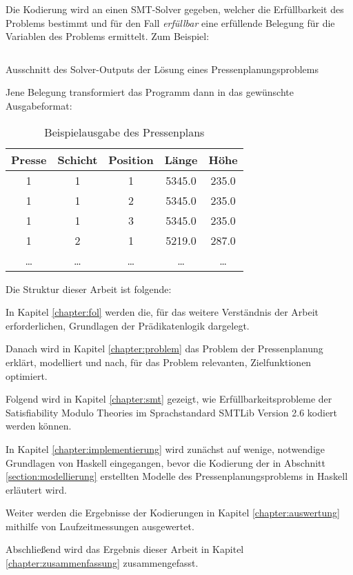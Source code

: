 Die Kodierung wird an einen SMT-Solver gegeben, welcher die Erfüllbarkeit des Problems bestimmt und für den Fall \textit{erfüllbar} eine erfüllende Belegung für die Variablen des Problems ermittelt.
Zum Beispiel:

\begin{listing}[H]
    \inputminted{bash}{Code/Einleitung/PressenlängeConstraintSolverOutput.smt2}
    \caption{Ausschnitt des Solver-Outputs der Lösung eines Pressenplanungsproblems}
    \label{listing:barLengthSolverOutput}
\end{listing}

Jene Belegung transformiert das Programm dann in das gewünschte Ausgabeformat:

\begin{table}[H]
    \centering
    \begin{tabular}{|c|c|c|c|c|}
        \hline
        \textbf{Presse} & \textbf{Schicht} & \textbf{Position} & \textbf{Länge} & \textbf{Höhe} \\
        \hline
        1 & 1 & 1 & 5345.0 & 235.0 \\
        1 & 1 & 2 & 5345.0 & 235.0 \\
        1 & 1 & 3 & 5345.0 & 235.0 \\
        1 & 2 & 1 & 5219.0 & 287.0 \\
        \ldots & \ldots & \ldots & \ldots & \ldots \\
        \hline
    \end{tabular}
    \caption{Beispielausgabe des Pressenplans}
    \label{table:pressenplan}
\end{table}

Die Struktur dieser Arbeit ist folgende:

In Kapitel \ref{chapter:fol} werden die, für das weitere Verständnis der Arbeit erforderlichen, Grundlagen der Prädikatenlogik dargelegt.

Danach wird in Kapitel \ref{chapter:problem} das Problem der Pressenplanung erklärt, modelliert und nach, für das Problem relevanten, Zielfunktionen optimiert.

Folgend wird in Kapitel \ref{chapter:smt} gezeigt, wie Erfüllbarkeitsprobleme der Satisfiability Modulo Theories im Sprachstandard SMTLib Version 2.6 kodiert werden können.

In Kapitel \ref{chapter:implementierung} wird zunächst auf wenige, notwendige Grundlagen von Haskell eingegangen,
bevor die Kodierung der in Abschnitt \ref{section:modellierung} erstellten Modelle des Pressenplanungsproblems in Haskell erläutert wird.

Weiter werden die Ergebnisse der Kodierungen in Kapitel \ref{chapter:auswertung} mithilfe von Laufzeitmessungen ausgewertet.

Abschließend wird das Ergebnis dieser Arbeit in Kapitel \ref{chapter:zusammenfassung} zusammengefasst.